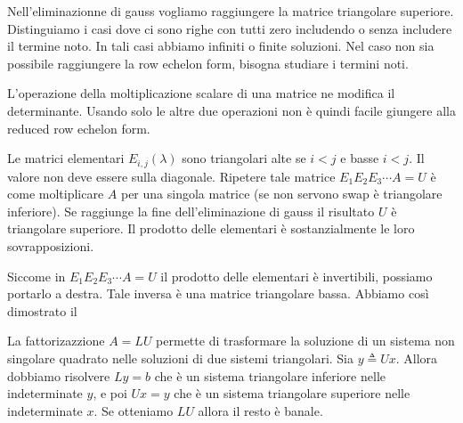 \documentclass[a4paper]{article}
\begin{document}
Nell'eliminazionne di gauss vogliamo raggiungere la matrice triangolare superiore.
Distinguiamo i casi dove ci sono righe con tutti zero includendo o senza includere il termine noto.
In tali casi abbiamo infiniti o finite soluzioni.
Nel caso non sia possibile raggiungere la row echelon form, bisogna studiare i termini noti.

L'operazione della moltiplicazione scalare di una matrice ne modifica il determinante.
Usando solo le altre due operazioni non è quindi facile giungere alla reduced row echelon form.

Le matrici elementari \(E_{i,j}(\lambda)\) sono triangolari alte se \(i<j\) e basse \(i<j\).
Il valore non deve essere sulla diagonale.
Ripetere tale matrice \(E_1E_2E_3 \cdots A = U\) è come moltiplicare \(A\) per una singola matrice
(se non servono swap è triangolare inferiore). Se raggiunge la fine dell'eliminazione di gauss il risultato \(U\)
è triangolare superiore.
Il prodotto delle elementari è sostanzialmente le loro sovrapposizioni.





Siccome in \(E_1E_2E_3 \cdots A = U\) il prodotto delle elementari è invertibili, possiamo portarlo a destra.
Tale inversa è una matrice triangolare bassa. Abbiamo così dimostrato il


La fattorizazzione \(A=LU\) permette di trasformare la soluzione di un sistema
non singolare quadrato nelle soluzioni di due sistemi triangolari.
Sia \(y \triangleq Ux\). Allora dobbiamo risolvere
\(Ly = b\) che è un sistema triangolare inferiore nelle indeterminate \(y\),
e poi \(Ux = y\) che è un sistema triangolare superiore nelle indeterminate \(x\).
Se otteniamo \(LU\) allora il resto è banale.
\end{document}
